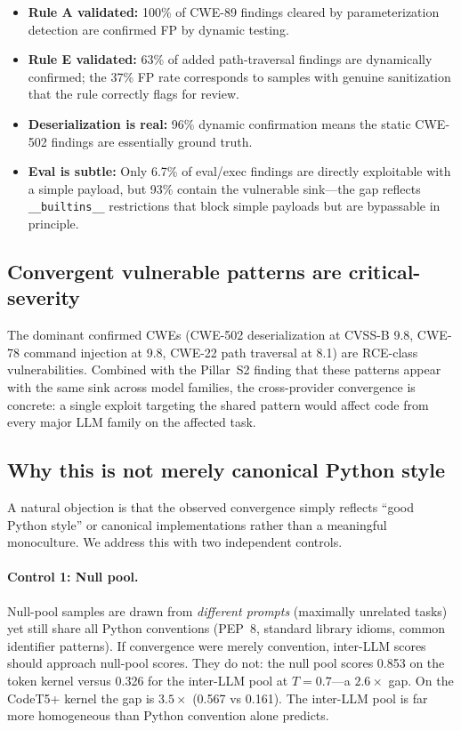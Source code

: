 \documentclass{article}
\newcommand{\code}[1]{\texttt{#1}}
\begin{document}
\begin{itemize}[leftmargin=*]
  \item \textbf{Rule A validated:} 100\% of CWE-89 findings cleared by
    parameterization detection are confirmed FP by dynamic testing.
  \item \textbf{Rule E validated:} 63\% of added path-traversal findings
    are dynamically confirmed; the 37\% FP rate corresponds to samples with
    genuine sanitization that the rule correctly flags for review.
  \item \textbf{Deserialization is real:} 96\% dynamic confirmation means
    the static CWE-502 findings are essentially ground truth.
  \item \textbf{Eval is subtle:} Only 6.7\% of eval/exec findings are
    directly exploitable with a simple payload, but 93\% contain the
    vulnerable sink---the gap reflects \code{\_\_builtins\_\_} restrictions
    that block simple payloads but are bypassable in principle.
\end{itemize}

\subsection{Convergent vulnerable patterns are critical-severity}

The dominant confirmed CWEs (CWE-502 deserialization at CVSS-B 9.8, CWE-78
command injection at 9.8, CWE-22 path traversal at 8.1) are RCE-class
vulnerabilities. Combined with the Pillar~S2 finding that these patterns
appear with the same sink across model families, the cross-provider
convergence is concrete: a single exploit targeting the shared pattern
would affect code from every major LLM family on the affected task.

\subsection{Why this is not merely canonical Python style}

A natural objection is that the observed convergence simply reflects
``good Python style'' or canonical implementations rather than a meaningful
monoculture. We address this with two independent controls.

\paragraph{Control 1: Null pool.}
Null-pool samples are drawn from \emph{different prompts} (maximally
unrelated tasks) yet still share all Python conventions (PEP~8, standard
library idioms, common identifier patterns). If convergence were merely
convention, inter-LLM scores should approach null-pool scores. They do not:
the null pool scores 0.853 on the token kernel versus 0.326 for the
inter-LLM pool at $T{=}0.7$---a $2.6\times$ gap. On the CodeT5+ kernel the
gap is $3.5\times$ (0.567 vs 0.161). The inter-LLM pool is far more
homogeneous than Python convention alone predicts.
\end{document}
